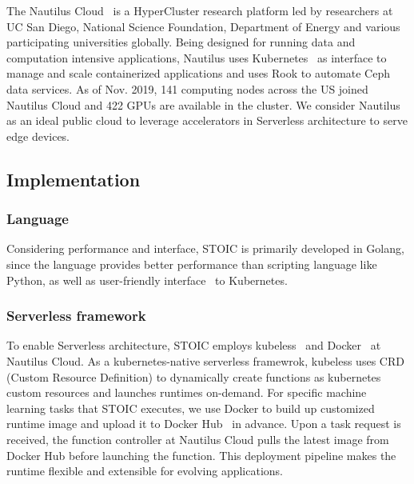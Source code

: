  The Nautilus Cloud~\cite{ref:nautilus} is a HyperCluster research platform led by researchers at UC San Diego, National Science Foundation, Department of Energy and various participating universities globally. Being designed for running data and computation intensive applications, Nautilus uses Kubernetes~\cite{ref:k8s} as interface to manage and scale containerized applications and uses Rook to automate Ceph~\cite{ref:ceph} data services. As of Nov. 2019, 141 computing nodes across the US joined Nautilus Cloud and 422 GPUs are available in the cluster. We consider Nautilus as an ideal public cloud to leverage accelerators in Serverless architecture to serve edge devices. 
 
 \subsection{Implementation}
 
 \subsubsection{Language}
 Considering performance and interface, STOIC is primarily developed in Golang, since the language provides better performance than scripting language like Python, as well as user-friendly interface~\cite{ref:client-go} to Kubernetes. 
 
 \BlankLine
 \subsubsection{Serverless framework}
 To enable Serverless architecture, STOIC employs kubeless~\cite{ref:kubeless} and Docker~\cite{ref:docker} at Nautilus Cloud. As a kubernetes-native serverless framewrok, kubeless uses CRD (Custom Resource Definition)\cite{ref:crd} to dynamically create functions as kubernetes custom resources and launches runtimes on-demand. For specific machine learning tasks that STOIC executes, we use Docker to build up customized runtime image and upload it to Docker Hub~\cite{ref:dockerhub} in advance. Upon a task request is received, the function controller at Nautilus Cloud pulls the latest image from Docker Hub before launching the function. This deployment pipeline makes the runtime flexible and extensible for evolving applications. 
 
 \BlankLine
